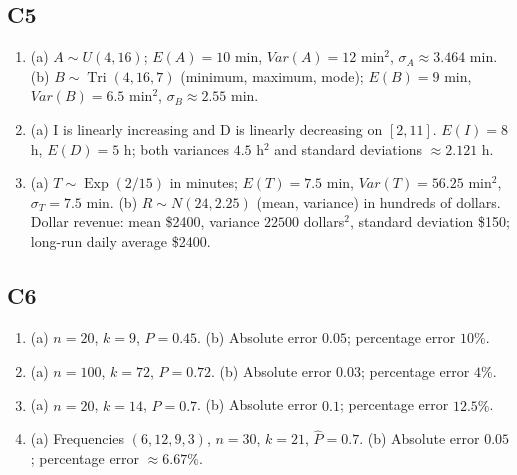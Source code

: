 {\subsection*{C5}
\begin{enumerate}[label=\textbf{C5.\arabic*.}]
\item (a) $A\sim U(4,16)$; $E(A)=10$ min, $Var(A)=12$ min$^2$, $\sigma_A\approx3.464$ min.
(b) $B\sim\operatorname{Tri}(4,16,7)$ (minimum, maximum, mode);
$E(B)=9$ min, $Var(B)=6.5$ min$^2$, $\sigma_B\approx2.55$ min.
\item (a) I is linearly increasing and D is linearly decreasing on $[2,11]$.
$E(I)=8$ h, $E(D)=5$ h; both variances $4.5$ h$^2$ and
standard deviations $\approx2.121$ h.
\item (a) $T\sim\operatorname{Exp}(2/15)$ in minutes;
$E(T)=7.5$ min, $Var(T)=56.25$ min$^2$, $\sigma_T=7.5$ min.
(b) $R\sim N(24,2.25)$ (mean, variance) in hundreds of dollars.
Dollar revenue: mean \$2400, variance $22500$ dollars$^2$,
standard deviation \$150; long-run daily average \$2400.
\end{enumerate}
\subsection*{C6}
\begin{enumerate}[label=\textbf{C6.\arabic*.}]
\item (a) $n=20$, $k=9$, $\widehat P=0.45$.
(b) Absolute error $0.05$; percentage error $10\%$.
\item (a) $n=100$, $k=72$, $\widehat P=0.72$.
(b) Absolute error $0.03$; percentage error $4\%$.
\item (a) $n=20$, $k=14$, $\widehat P=0.7$.
(b) Absolute error $0.1$; percentage error $12.5\%$.
\item (a) Frequencies $(6,12,9,3)$, $n=30$, $k=21$, $\widehat P=0.7$.
(b) Absolute error $0.05$; percentage error $\approx6.67\%$.
\end{enumerate}
}
